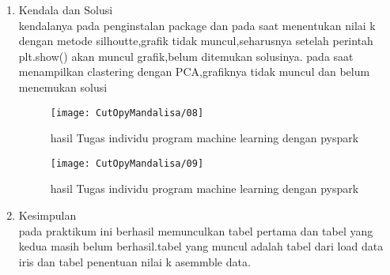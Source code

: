 \begin{enumerate}
\item Kendala dan Solusi\\
kendalanya pada penginstalan package dan pada saat menentukan nilai k dengan metode silhoutte,grafik tidak muncul,seharusnya setelah perintah plt.show() akan muncul grafik,belum ditemukan solusinya. pada saat menampilkan clastering dengan PCA,grafiknya tidak muncul dan belum menemukan solusi

\begin{figure}[!ht]
\texttt{[image: CutOpyMandalisa/08]}
\caption{hasil Tugas individu program machine learning dengan pyspark }
\label{gam:perkuliahan-05-01}
\end{figure}

\begin{figure}[!ht]
\texttt{[image: CutOpyMandalisa/09]}
\caption{hasil Tugas individu program machine learning dengan pyspark }
\label{gam:perkuliahan-05-01}
\end{figure}

\item Kesimpulan\\
pada praktikum ini berhasil memunculkan tabel pertama dan tabel yang kedua masih belum berhasil.tabel yang muncul adalah tabel dari load data iris dan tabel penentuan nilai k asemmble data.
\end{enumerate}